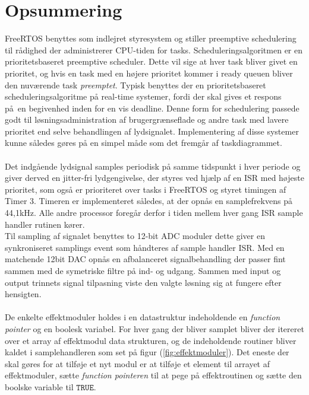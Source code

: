 \section{Opsummering}

FreeRTOS benyttes som indlejret styresystem og stiller preemptive schedulering til rådighed der administrerer CPU-tiden for tasks. 
Scheduleringsalgoritmen er en prioritetsbaseret preemptive scheduler.
Dette vil sige at hver task bliver givet en prioritet, og hvis en task med en højere prioritet kommer i ready queuen bliver den nuværende task \textit{preemptet}.
Typisk benyttes der en prioritetsbaseret scheduleringsalgoritme på real-time systemer, fordi der skal gives et respons på en begivenhed inden for en vis deadline.
Denne form for schedulering passede godt til løsningsadministration af brugergrænseflade og andre task med lavere prioritet end selve behandlingen af lydsignalet. 
Implementering af disse systemer kunne således gøres på en simpel måde som det fremgår af taskdiagrammet.
\\
\\
Det indgående lydsignal samples periodisk på samme tidspunkt i hver periode og giver derved en jitter-fri lydgengivelse, der
styres ved hjælp af en ISR med højeste prioritet, som også er prioriteret over tasks i FreeRTOS og styret timingen af Timer 3.
Timeren er implementeret således, at der opnås en samplefrekvens på 44,1kHz. 
Alle andre processor foregår derfor i tiden mellem hver gang ISR sample handler rutinen kører. 
\\
Til sampling af signalet benyttes to 12-bit ADC moduler dette giver en synkroniseret samplings event som håndteres af sample handler ISR.
Med en matchende 12bit DAC opnås en afbalanceret signalbehandling der passer fint sammen med de symetriske filtre på ind- og udgang.
Sammen med input og output trinnets signal tilpasning viste den valgte løsning sig at fungere efter hensigten.
\\
\\
De enkelte effektmoduler holdes i en datastruktur indeholdende en \textit{function pointer} og en boolesk variabel.
For hver gang der bliver samplet bliver der itereret over et array af effektmodul data strukturen, og de indeholdende routiner bliver kaldet i samplehandleren som set på figur (\ref{fig:effektmoduler}).\newline
Det eneste der skal gøres for at tilføje et nyt modul er at tilføje et element til arrayet af effektmoduler, sætte \textit{function pointeren} til at pege på effektroutinen og sætte den boolske variable til $\mathtt{TRUE}$.
